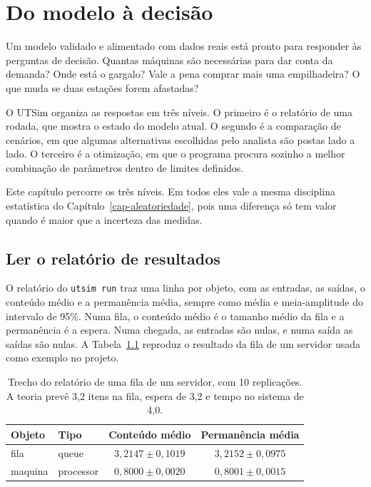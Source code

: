 \chapter{Do modelo à decisão}
\label{cap-decisao}


Um modelo validado e alimentado com dados reais está pronto para responder às perguntas de decisão. Quantas máquinas são necessárias para dar conta da demanda? Onde está o gargalo? Vale a pena comprar mais uma empilhadeira? O que muda se duas estações forem afastadas?

O UTSim organiza as respostas em três níveis. O primeiro é o relatório de uma rodada, que mostra o estado do modelo atual. O segundo é a comparação de cenários, em que algumas alternativas escolhidas pelo analista são postas lado a lado. O terceiro é a otimização, em que o programa procura sozinho a melhor combinação de parâmetros dentro de limites definidos.

Este capítulo percorre os três níveis. Em todos eles vale a mesma disciplina estatística do Capítulo~\ref{cap-aleatoriedade}, pois uma diferença só tem valor quando é maior que a incerteza das medidas.

\section{Ler o relatório de resultados}

O relatório do \texttt{utsim run} traz uma linha por objeto, com as entradas, as saídas, o conteúdo médio e a permanência média, sempre como média e meia-amplitude do intervalo de 95\%. Numa fila, o conteúdo médio é o tamanho médio da fila e a permanência é a espera. Numa chegada, as entradas são nulas, e numa saída as saídas são nulas. A Tabela~\ref{tab-relatorio} reproduz o resultado da fila de um servidor usada como exemplo no projeto.

\begin{table}[ht]
\centering
\caption{Trecho do relatório de uma fila de um servidor, com 10 replicações. A teoria prevê 3,2 itens na fila, espera de 3,2 e tempo no sistema de 4,0.}
\label{tab-relatorio}
\begin{tabular}{@{}llcc@{}}
\toprule
\textbf{Objeto} & \textbf{Tipo} & \textbf{Conteúdo médio} & \textbf{Permanência média} \\
\midrule
fila    & queue     & $3{,}2147 \pm 0{,}1019$ & $3{,}2152 \pm 0{,}0975$ \\
maquina & processor & $0{,}8000 \pm 0{,}0020$ & $0{,}8001 \pm 0{,}0015$ \\
\bottomrule
\end{tabular}
\end{table}

